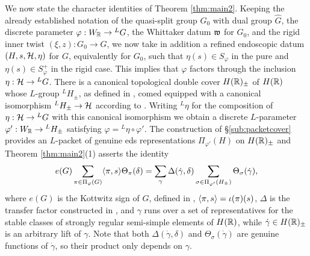 \documentclass{article}
\theoremstyle{definition}
\numberwithin{equation}{section}
\renewcommand{\-}{\hyp{}}
\begin{document}
We now state the character identities of Theorem \ref{thm:main2}. Keeping the already established notation of the quasi-split group $G_0$ with dual group $\hat G$, the discrete parameter $\varphi : W_{\mathbb{R}} \to {^LG}$, the Whittaker datum $\mathfrak{w}$ for $G_0$, and the rigid inner twist $(\xi,z) : G_0 \to G$, we now take in addition a refined endoscopic datum $(H,s,\mathcal{H},\eta)$ for $G$, equivalently for $G_0$, such that $\eta(s) \in S_\varphi$ in the pure and $\eta(s) \in S_\varphi^+$ in the rigid case. This implies that $\varphi$ factors through the inclusion $\eta : \mathcal{H} \to {^LG}$. There is a canonical topological double cover $H(\mathbb{R})_\pm$ of $H(\mathbb{R})$ whose $L$-group $^LH_\pm$, as defined in \cite[\S2.6]{KalHDC}, comed equipped with a canonical isomorphism $^LH_\pm \to \mathcal{H}$ according to \cite[\S3.1]{KalHDC}. Writing $^L\eta$ for the composition of $\eta : \mathcal{H} \to {^LG}$ with this canonical isomorphism we obtain a discrete $L$-parameter $\varphi' : W_{\mathbb{R}} \to {^LH_\pm}$ satisfying $\varphi = {^L\eta}\circ\varphi'$. The construction of \S\ref{sub:packetcover} provides an $L$-packet of genuine eds representations $\Pi_{\varphi'}(H)$ on $H(\mathbb{R})_\pm$ and Theorem \ref{thm:main2}(1) asserts the identity
\begin{equation} \label{eq:s4}
	e(G)\sum_{\pi \in \Pi_\varphi(G)}\langle\pi,s\rangle\Theta_\pi(\delta) = \sum_\gamma \Delta(\dot\gamma,\delta)\sum_{\sigma \in \Pi_{\varphi'}(H_\pm)} \Theta_{\sigma}(\dot\gamma),
\end{equation}
where $e(G)$ is the Kottwitz sign of $G$, defined in \cite{Kot83}, $\langle\pi,s\rangle=\iota(\pi)(s)$, $\Delta$ is the transfer factor constructed in \cite[\S4.3]{KalHDC}, and $\gamma$ runs over a set of representatives for the stable classes of strongly regular semi-simple elements of $H(\mathbb{R})$, while $\dot \gamma \in H(\mathbb{R})_\pm$ is an arbitrary lift of $\gamma$. Note that both $\Delta(\dot\gamma,\delta)$ and $\Theta_{\sigma}(\dot\gamma)$ are genuine functions of $\dot\gamma$, so their product only depends on $\gamma$.
\end{document}
